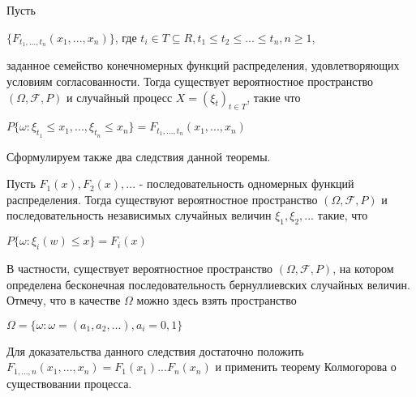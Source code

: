 \begin{theorem} Пусть 
\begin{center}
$\lbrace F_{t_{1}, ..., t_{n}}(x_1, ..., x_n) \rbrace $, где $t_i \in T \subseteq R, t_1 \le t_2 \le ... \le t_n, n \geq 1$,
\end{center}
заданное семейство конечномерных функций распределения, удовлетворяющих условиям согласованности. Тогда существует вероятностное пространство $(\Omega , \mathscr{F}, P)$ и случайный процесс $X = (\xi_{t})_{t \in T }$, такие что 
\begin{center}
$P \lbrace \omega : \xi_{t_1} \leq x_1, ..., \xi_{t_n} \leq x_n \rbrace = F_{{t_1}, ..., {t_n}} (x_1, ..., x_n) $
\end{center}
\end{theorem}

Сформулируем также два следствия данной теоремы.

\begin{corollary} Пусть $F_1 (x),  F_2 (x), ...$ - последовательность одномерных функций распределения. Тогда существуют вероятностное пространство $(\Omega , \mathscr{F}, P)$ и последовательность независимых случайных величин $\xi_1,  \xi_2, ... $ такие, что
	\begin{center}
	$P \lbrace \omega : \xi_i (w) \leq x \rbrace = F_i (x)$
	\end{center}
	В частности, существует вероятностное пространство $(\Omega , \mathscr{F}, P)$, на котором определена бесконечная последовательность бернуллиевских случайных величин. Отмечу, что в качестве $\Omega$ можно здесь взять пространство
	\begin{center}
	$\Omega = \lbrace \omega : \omega = (a_1, a_2, ...), a_i = 0, 1 \rbrace$
	\end{center}
\end{corollary}

Для доказательства данного следствия достаточно положить $F_{1, ..., n} (x_1, ..., x_n) = F_1 (x_1) ... F_n (x_n)$ и применить теорему Колмогорова о существовании процесса.

